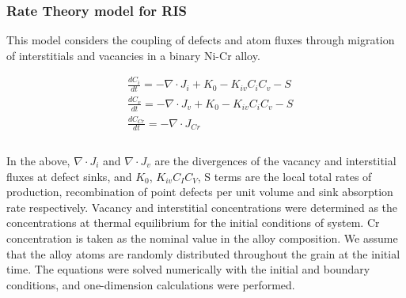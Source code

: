 \documentclass[utf8]{frontiersSCNS} %
\begin{document}
    \subsubsection{Rate Theory model for RIS}

    This model considers the coupling of defects and atom fluxes through migration of interstitials and vacancies in a binary Ni-Cr alloy.

    \begin{equation}
        \begin{aligned}
        &\frac{dC_i}{dt} = - \nabla\cdot J_i + K_0 - K_{iv}C_iC_v - S \\
        &\frac{dC_v}{dt} = - \nabla\cdot J_v + K_0 - K_{iv}C_iC_v - S\\
        &\frac{dC_{Cr}}{dt} = - \nabla\cdot J_{Cr} \\
        \end{aligned}
        \label{equation:RIS_equations}
     \end{equation}\\
    In the above, $\nabla\cdot J_i$ and $\nabla\cdot J_v$ are the divergences of the vacancy and interstitial fluxes at defect sinks, and $K_0$, $K_{iv}C_IC_V$, S terms are the local total rates of production, recombination of point defects per unit volume and sink absorption rate respectively.
    Vacancy and interstitial concentrations were determined as the concentrations at thermal equilibrium for the initial conditions of system. Cr concentration is taken as the nominal value in the alloy composition. We assume that the alloy atoms are randomly distributed throughout the grain at the initial time. The equations were solved numerically with the initial and boundary conditions, and one-dimension calculations were performed.
\end{document}

